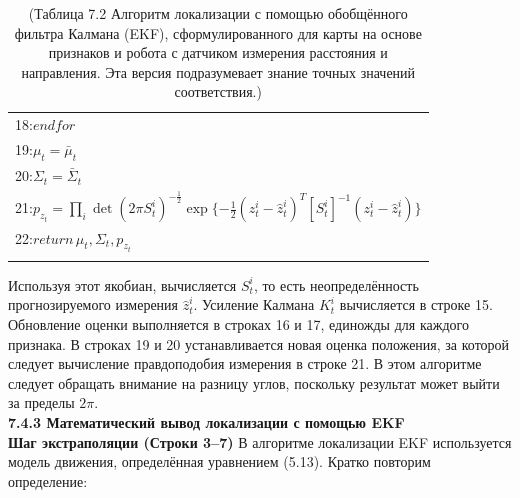 \documentclass[10pt,a4paper]{article}
\begin{document}
\begin{table}[H]
\begin{center}
\begin{tabular}{|l|}
18:\hspace{4mm}$\textit{endfor}$\\
19:\hspace{4mm}$\mu_t=\bar{\mu}_t$\\
20:\hspace{4mm}$\varSigma_t=\bar{\varSigma}_t$\\
21:\hspace{4mm}$p_{z_t}=\prod_i \det(2\pi S_t^i)^{-\frac{1}{2}}\exp\{-\frac{1}{2}(z_t^i-\hat{z}_t^i)^T[S_t^i]^{-1}(z_t^i-\hat{z}_t^i)\}$\\
22:\hspace{4mm}$\textit{return}\,\mu_t,\varSigma_t,p_{z_t}$\\
{}\\
\hline
\end{tabular}
\caption{(Таблица 7.2 Алгоритм локализации с помощью обобщённого фильтра Калмана (EKF), сформулированного для карты на основе признаков и робота с датчиком измерения расстояния и направления. Эта версия подразумевает знание точных значений соответствия.)}
\end{center}
\end{table}

 Используя этот якобиан, вычисляется $S_t^i$, то есть неопределённость прогнозируемого измерения $\hat{z}_t^i$. Усиление Калмана $K_t^i$ вычисляется в строке 15. Обновление оценки выполняется в строках 16 и 17, единожды для каждого признака. В строках 19 и 20 устанавливается новая оценка положения, за которой следует вычисление правдоподобия измерения в строке 21. В этом алгоритме следует обращать внимание на разницу углов, поскольку результат может выйти за пределы $2\pi$.\\
 
\textbf{7.4.3 Математический вывод локализации с помощью EKF }\\

\textbf{Шаг экстраполяции (Строки 3–7)} В алгоритме локализации EKF используется модель движения, определённая уравнением (5.13). Кратко повторим определение:\\
\end{document}
